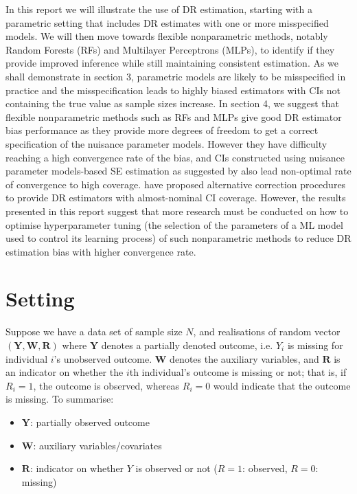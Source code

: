 \documentclass[12pt,twoside]{article}
\begin{document}
In this report we will illustrate the use of DR estimation, starting with a parametric setting that includes DR estimates with one or more misspecified models. We will then move towards flexible nonparametric methods, notably Random Forests (RFs) and Multilayer Perceptrons (MLPs), to identify if they provide improved inference while still maintaining consistent estimation. As we shall demonstrate in section 3, parametric models are likely to be misspecified in practice and the misspecification leads to highly biased estimators with CIs not containing the true value as sample sizes increase. In section 4, we suggest that flexible nonparametric methods such as RFs and MLPs give good DR estimator bias performance as they provide more degrees of freedom to get a correct specification of the nuisance parameter models. However they have difficulty reaching a high convergence rate of the bias, and CIs constructed using nuisance parameter models-based SE estimation as suggested by \cite{davidian} also lead non-optimal rate of convergence to high coverage. \cite{benkeser2017} have proposed alternative correction procedures to provide DR estimators with almost-nominal CI coverage. However, the results presented in this report suggest that more research must be conducted on how to optimise hyperparameter tuning (the selection of the parameters of a ML model used to control its learning process) of such nonparametric methods to reduce DR estimation bias with higher convergence rate.


\section{Setting} 

Suppose we have a data set of sample size $N$, and realisations of random vector $(\mathbf{Y}, \mathbf{W}, \mathbf{R})$ where $\mathbf{Y}$ denotes a partially denoted outcome, i.e. $Y_i$ is missing for individual $i$'s unobserved outcome. $\mathbf{W}$ denotes the auxiliary variables, and $\mathbf{R}$ is an indicator on whether the $i$th individual's outcome is missing or not; that is, if $R_i = 1$, the outcome is observed, whereas $R_i = 0$ would indicate that the outcome is missing.
To summarise:
\begin{itemize}
    \item $\mathbf{Y}$: partially observed outcome 
    \item $\mathbf{W}$: auxiliary variables/covariates 
    \item $\mathbf{R}$: indicator on whether $Y$ is observed or not ($R = 1$: observed, $R = 0$: missing) 
\end{itemize}
\end{document}
